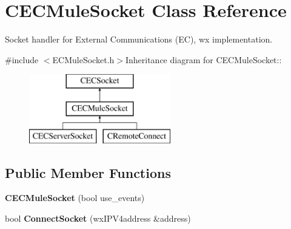 \section{CECMuleSocket Class Reference}
\label{classCECMuleSocket}


Socket handler for External Communications (EC), wx implementation.  


{\ttfamily \#include $<$ECMuleSocket.h$>$}Inheritance diagram for CECMuleSocket::\begin{figure}[H]
\begin{center}
\leavevmode
\includegraphics[height=3cm]{classCECMuleSocket}
\end{center}
\end{figure}
\subsection*{Public Member Functions}
\begin{DoxyCompactItemize}
\item 
{\bfseries CECMuleSocket} (bool use\_\-events)\label{classCECMuleSocket_ae38ee36620f4ef6a82b59af2141205d3}

\item 
bool {\bfseries ConnectSocket} (wxIPV4address \&address)\label{classCECMuleSocket_af887246814c7531d8c2f4e50a6604b3b}

\end{DoxyCompactItemize}

